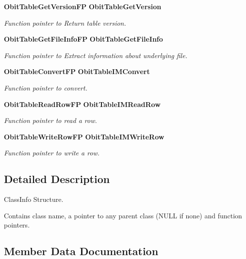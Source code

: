 \begin{CompactItemize}
{\bf Obit\-Table\-Get\-Version\-FP} {\bf Obit\-Table\-Get\-Version}
\begin{CompactList}\small\item\em Function pointer to Return table version. \item\end{CompactList}\item 
{\bf Obit\-Table\-Get\-File\-Info\-FP} {\bf Obit\-Table\-Get\-File\-Info}
\begin{CompactList}\small\item\em Function pointer to Extract information about underlying file. \item\end{CompactList}\item 
{\bf Obit\-Table\-Convert\-FP} {\bf Obit\-Table\-IMConvert}
\begin{CompactList}\small\item\em Function pointer to convert. \item\end{CompactList}\item 
{\bf Obit\-Table\-Read\-Row\-FP} {\bf Obit\-Table\-IMRead\-Row}
\begin{CompactList}\small\item\em Function pointer to read a row. \item\end{CompactList}\item 
{\bf Obit\-Table\-Write\-Row\-FP} {\bf Obit\-Table\-IMWrite\-Row}
\begin{CompactList}\small\item\em Function pointer to write a row. \item\end{CompactList}\end{CompactItemize}


\subsection{Detailed Description}
Class\-Info Structure. 

Contains class name, a pointer to any parent class (NULL if none) and function pointers. 



\subsection{Member Data Documentation}
